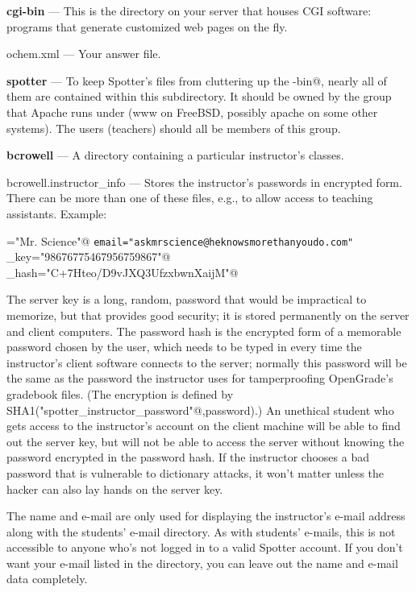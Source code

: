 \documentclass{doc}
\begin{document}
\newcommand{\dir}[1]{\noindent\textbf{#1} --- }
\newcommand{\file}[1]{\noindent{}#1 --- }

\dir{cgi-bin} This is the directory on your server that houses CGI software:
programs that generate customized web pages on the fly.

\file{ochem.xml} Your answer file.

\dir{spotter} To keep Spotter's files from cluttering up the \verb@cgi-bin@,
nearly all of them are contained within this subdirectory. It should be owned
by the group that Apache runs under (www on FreeBSD, possibly apache on some
other systems). The users (teachers) should all be members of this group.

\dir{bcrowell} A directory containing a particular instructor's classes.

\file{bcrowell.instructor\_info} Stores the instructor's passwords in encrypted form.
There can be more than one of these files, e.g., to allow access to teaching assistants.
Example:

\verb@name="Mr. Science"@
\verb+email="askmrscience@heknowsmorethanyoudo.com"+
\verb@server_key="98676775467956759867"@\\
\verb@password_hash="C+7Hteo/D9vJXQ3UfzxbwnXaijM"@

The server key is a long, random, password that would be impractical to memorize, but that
provides good security; it is stored permanently on the server and client computers.
The password hash is the encrypted form of a memorable password chosen by the user, which
needs to be typed in every time the instructor's client software connects
to the server; normally this password will be the same as the password the instructor uses
for tamperproofing OpenGrade's gradebook files. (The encryption is defined by
SHA1(\verb@"spotter_instructor_password"@,password).)
An unethical student who gets access to the
instructor's account on the client machine will be able to find out the server key, but will not
be able to access the server without knowing the password encrypted in the password hash.
If the instructor chooses a bad password that is vulnerable to dictionary attacks, it won't
matter unless the hacker can also lay hands on the server key.

The name and e-mail are only used for displaying the instructor's e-mail address along with the
students' e-mail directory. As with students' e-mails, this is not accessible to anyone who's
not logged in to a valid Spotter account. If you don't want your e-mail listed in the directory,
you can leave out the name and e-mail data completely.
\end{document}
